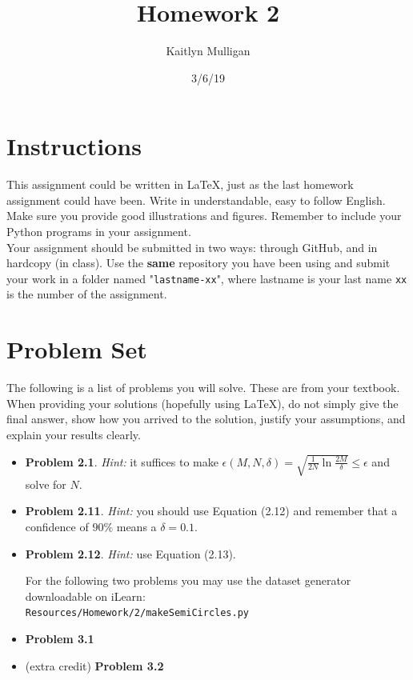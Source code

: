 \documentclass[a4paper]{article}
\title{Homework 2}
\author{Kaitlyn Mulligan}
\date{3/6/19}
\newcommand\tab[1][0.5cm]{\hspace*{#1}}
\begin{document}
\lstset{language=Python}

\maketitle

\section{Instructions}
This assignment could be written in \LaTeX, just as the last homework assignment could 
have been.  Write in understandable, easy to follow English.  Make sure you provide good 
illustrations and figures.  Remember to include your Python programs in your assignment.\\
\tab Your assignment should be submitted in two ways: through GitHub, and in hardcopy (in 
class).  Use the \textbf{same} repository you have been using and submit your work in a 
folder named "\verb|lastname-xx|", where lastname is your last name \verb|xx| is the number 
of the assignment.


\section{Problem Set}
The following is a list of problems you will solve.  These are from your textbook.  When 
providing your solutions (hopefully using \LaTeX), do not simply give the final answer, show 
how you arrived to the solution, justify your assumptions, and explain your results clearly.
\begin{itemize}
    \item \textbf{Problem 2.1}. \textit{Hint:} it suffices to make $\epsilon(M, N, \delta) = 
    \sqrt{\frac{1}{2N} \ln \frac{2M}{\delta}} \leq \epsilon$ and solve for $N$.
    \item \textbf{Problem 2.11}. \textit{Hint:} you should use Equation (2.12) and remember 
    that a confidence of $90\%$ means a $\delta = 0.1$.
    \item \textbf{Problem 2.12}. \textit{Hint:} use Equation (2.13).
    
    For the following two problems you may use the dataset generator downloadable on iLearn:\\
    \verb|Resources/Homework/2/makeSemiCircles.py|
    \item \textbf{Problem 3.1}
    \item (extra credit) \textbf{Problem 3.2}
\end{itemize}
\end{document}
